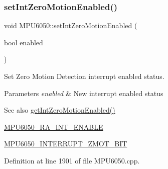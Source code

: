 \begin{DoxyCode}{0}

\end{DoxyCode}
\mbox{\label{classMPU6050_a5e36e3acace6e545718d7997169cff9b}} 
\subsubsection{\texorpdfstring{setIntZeroMotionEnabled()}{setIntZeroMotionEnabled()}}
{\footnotesize\ttfamily void M\+P\+U6050\+::set\+Int\+Zero\+Motion\+Enabled (\begin{DoxyParamCaption}\item[{bool}]{enabled }\end{DoxyParamCaption})}

Set Zero Motion Detection interrupt enabled status. 
\begin{DoxyParams}{Parameters}
{\em enabled} & New interrupt enabled status \\
\hline
\end{DoxyParams}
\begin{DoxySeeAlso}{See also}
\mbox{\hyperlink{classMPU6050_ab3cc9bcaca6cec61e7f3f0c6c8a37db5}{get\+Int\+Zero\+Motion\+Enabled()}} 

\mbox{\hyperlink{MPU6050_8h_a1de9d9557aa7420c746721999df4a377}{M\+P\+U6050\+\_\+\+R\+A\+\_\+\+I\+N\+T\+\_\+\+E\+N\+A\+B\+LE}} 

\mbox{\hyperlink{MPU6050_8h_aa4a24f325b4449adf83ce8458bb31a08}{M\+P\+U6050\+\_\+\+I\+N\+T\+E\+R\+R\+U\+P\+T\+\_\+\+Z\+M\+O\+T\+\_\+\+B\+IT}} 
\end{DoxySeeAlso}


Definition at line 1901 of file M\+P\+U6050.\+cpp.


